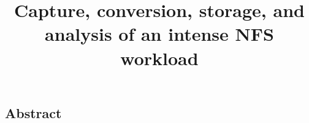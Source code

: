 \documentclass[twocolumn, 10pt]{article}
\begin{document}
\title{\Large \bf Capture, conversion, storage, and analysis of an intense NFS workload}

\date{}
\maketitle


\subsection*{Abstract}










\end{document}
